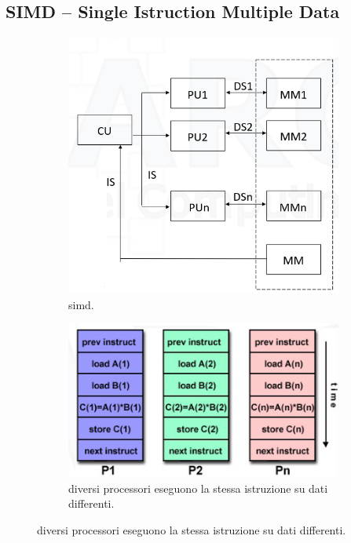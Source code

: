 \subsection*{SIMD -- Single Istruction  Multiple Data}
\begin{figure}[th]
	\begin{subfigure}{0.45\linewidth}
		\centering
		\includegraphics[width=\linewidth]{img/simd}
		\caption{simd.}
		\label{fig:simd}
	\end{subfigure}
	\hfill
	\begin{subfigure}{0.45\linewidth}
		\centering
		\includegraphics[width=\linewidth]{img/simd-processori}
		\caption{diversi processori eseguono la stessa istruzione su dati differenti.}
		\label{fig:simd-processori}
	\end{subfigure}
\end{figure}
